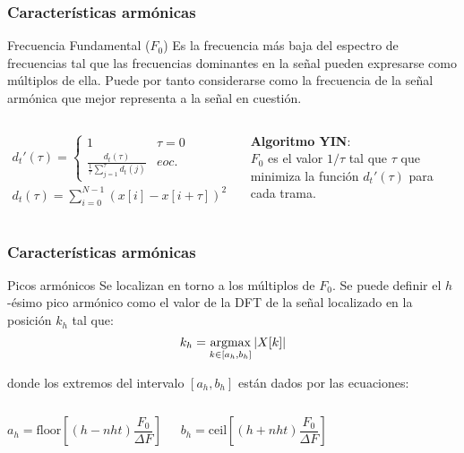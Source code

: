 \begin{frame}
    \frametitle{Características armónicas}

    \begin{block}{Frecuencia Fundamental ($F_0$)}
        Es la frecuencia más baja del espectro de frecuencias tal que las frecuencias dominantes en la señal pueden expresarse como múltiplos de ella.
        Puede por tanto considerarse como la frecuencia de la señal armónica que mejor representa a la señal en cuestión.
    \end{block}

    \pause
    \begin{columns}

        {\tiny
        \begin{gather*}
            d_t'(\tau) = \begin{cases}
                             1 & \tau = 0 \\
                             \frac{d_t(\tau)}{\frac{1}{\tau}{\sum_{j=1}^{\tau}{d_t(j)}}} & eoc.
            \end{cases}\\
            d_t(\tau) = \sum_{i=0}^{N-1}{(x[i]-x[i+\tau])^2}
        \end{gather*}
        }


        \textbf{Algoritmo YIN}:\\
        $F_0$ es el valor $1/\tau$ tal que $\tau$ que minimiza la función $d_t'(\tau)$ para cada trama.

    \end{columns}
\end{frame}

\begin{frame}
    \frametitle{Características armónicas}

    \begin{block}{Picos armónicos}
        Se localizan en torno a los múltiplos de $F_0$.
        Se puede definir el $h$-ésimo pico armónico como el valor de la DFT de la señal localizado en la posición $k_h$ tal que:
        \begin{equation*}
            k_h = \operatorname*{argmax}_{k\in [a_h,b_h]}|X[k]|
        \end{equation*}
    \end{block}

    donde los extremos del intervalo $[a_h, b_h]$ están dados por las ecuaciones:

    {\small
    \begin{columns}
        \begin{equation*}
            a_h = \text{floor}\left[ (h - nht)\frac{F_0}{\Delta F} \right]
        \end{equation*}

        \begin{equation*}
            b_h = \text{ceil}\left[ (h + nht)\frac{F_0}{\Delta F} \right]
        \end{equation*}
    \end{columns}
    }
\end{frame}

